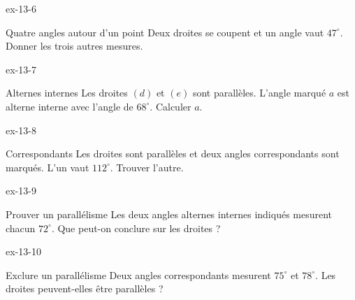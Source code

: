 \begin{blocLivre}{ex-13-6}\begin{exercice}[2]{Quatre angles autour d’un point}
Deux droites se coupent et un angle vaut $47^\circ$. Donner les trois autres mesures.
\label{fig-ex-13-6}
\end{exercice}\end{blocLivre}
\begin{blocLivre}{ex-13-7}\begin{exercice}[2]{Alternes internes}
Les droites $(d)$ et $(e)$ sont parallèles. L’angle marqué $a$ est alterne interne avec l’angle de $68^\circ$. Calculer $a$.
\label{fig-ex-13-7}
\end{exercice}\end{blocLivre}
\begin{blocLivre}{ex-13-8}\begin{exercice}[2]{Correspondants}
Les droites sont parallèles et deux angles correspondants sont marqués. L’un vaut $112^\circ$. Trouver l’autre.
\label{fig-ex-13-8}
\end{exercice}\end{blocLivre}
\begin{blocLivre}{ex-13-9}\begin{exercice}[2]{Prouver un parallélisme}
Les deux angles alternes internes indiqués mesurent chacun $72^\circ$. Que peut-on conclure sur les droites ?
\label{fig-ex-13-9}
\end{exercice}\end{blocLivre}
\begin{blocLivre}{ex-13-10}\begin{exercice}[2]{Exclure un parallélisme}
Deux angles correspondants mesurent $75^\circ$ et $78^\circ$. Les droites peuvent-elles être parallèles ?
\label{fig-ex-13-10}
\end{exercice}\end{blocLivre}

